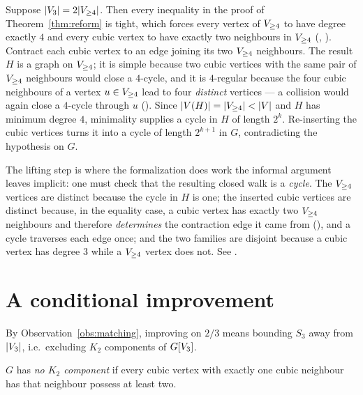 \documentclass[11pt,a4paper]{article}
\begin{document}
Suppose $\lvert V_{3} \rvert = 2\lvert V_{\ge 4} \rvert$. Then every inequality in the proof of
Theorem~\ref{thm:reform} is tight, which forces every vertex of $V_{\ge 4}$ to have degree
exactly $4$ and every cubic vertex to have exactly two neighbours in $V_{\ge 4}$
(, ).
Contract each cubic vertex to an edge joining its two $V_{\ge 4}$ neighbours. The result $H$ is
a graph on $V_{\ge 4}$; it is simple because two cubic vertices with the same pair of $V_{\ge 4}$
neighbours would close a $4$-cycle, and it is $4$-regular because the four cubic
neighbours of a vertex $u \in V_{\ge 4}$ lead to four \emph{distinct} vertices --- a collision
would again close a $4$-cycle through $u$ (). Since
$\lvert V(H) \rvert = \lvert V_{\ge 4} \rvert < \lvert V \rvert$ and $H$ has minimum degree $4$, minimality
supplies a cycle in $H$ of length $2^k$. Re-inserting the cubic vertices turns it into a
cycle of length $2^{k+1}$ in $G$, contradicting the hypothesis on $G$.

\begin{remark}
The lifting step is where the formalization does work the informal argument leaves
implicit: one must check that the resulting closed walk is a \emph{cycle}. The $V_{\ge 4}$
vertices are distinct because the cycle in $H$ is one; the inserted cubic vertices are
distinct because, in the equality case, a cubic vertex has exactly two $V_{\ge 4}$ neighbours
and therefore \emph{determines} the contraction edge it came from
(), and a cycle traverses each edge once; and the two
families are disjoint because a cubic vertex has degree $3$ while a $V_{\ge 4}$ vertex does
not. See .
\end{remark}

\section{A conditional improvement}\label{sec:cond}

By Observation~\ref{obs:matching}, improving on $2/3$ means bounding $S_3$ away from
$\lvert V_{3} \rvert$, i.e.\ excluding $K_2$ components of $G[V_{3}]$.

\begin{definition}
$G$ has \emph{no $K_2$ component} if every cubic vertex with exactly one cubic neighbour
has that neighbour possess at least two. 
\end{definition}
\end{document}
